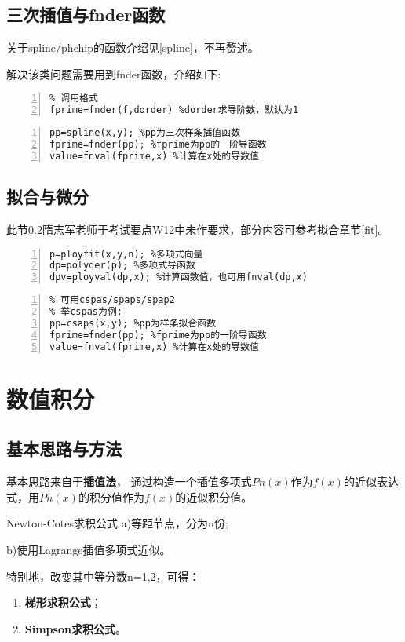 \subsection{三次插值与fnder函数}\label{cubic}
\begin{note}
关于spline/phchip的函数介绍见\ref{spline}，不再赘述。
\end{note}

解决该类问题需要用到fnder函数，介绍如下:

\begin{lstlisting}[frame=single,numbers=left]
% Differentiate function
% 调用格式
fprime=fnder(f,dorder) %dorder求导阶数，默认为1
\end{lstlisting}
\begin{lstlisting}[frame=single,numbers=left]
% 常用形式
pp=spline(x,y); %pp为三次样条插值函数
fprime=fnder(pp); %fprime为pp的一阶导函数
value=fnval(fprime,x) %计算在x处的导数值
\end{lstlisting}

\subsection{拟合与微分}\label{fitd}
\begin{note}
此节\ref{fitd}隋志军老师于考试要点W12中未作要求，部分内容可参考拟合章节\ref{fit}。
\end{note}

\begin{lstlisting}[frame=single,numbers=left]
% 多项式拟合求微分
p=ployfit(x,y,n); %多项式向量
dp=polyder(p); %多项式导函数
dpv=ployval(dp,x); %计算函数值，也可用fnval(dp,x)
\end{lstlisting}

\begin{lstlisting}[frame=single,numbers=left]
% 样条拟合求微分
% 可用cspas/spaps/spap2
% 举cspas为例:
pp=csaps(x,y); %pp为样条拟合函数
fprime=fnder(pp); %fprime为pp的一阶导函数
value=fnval(fprime,x) %计算在x处的导数值
\end{lstlisting}
\section{数值积分}
\subsection{基本思路与方法}
基本思路来自于\textcolor{third}{\textbf{插值法}}， 通过构造一个插值多项式$Pn(x)$作为$f(x)$的近似表达式，用$Pn(x)$的积分值作为$f(x)$的近似积分值。
\begin{definition}{Newton-Cotes求积公式}{}
a)等距节点，分为n份;

b)使用Lagrange插值多项式近似。
\end{definition}
特别地，改变其中等分数n=1,2，可得：
\begin{enumerate}
  \item \textbf{梯形求积公式}；
  \item \textbf{Simpson求积公式}。
\end{enumerate}

